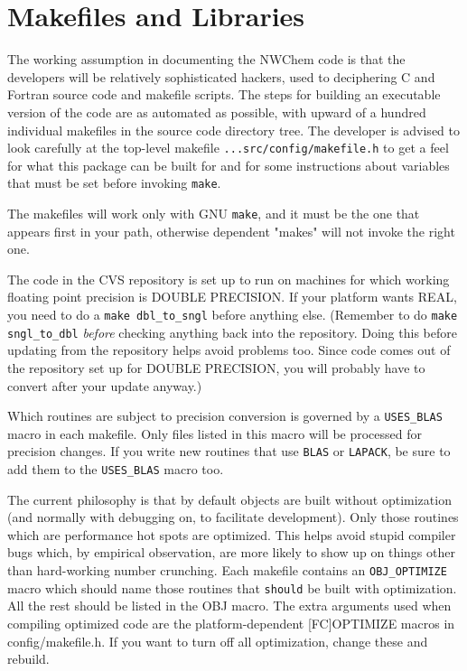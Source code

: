 \section{Makefiles and Libraries}
\label{sec:makelib}


The working assumption in documenting the NWChem code is that the
developers will be relatively sophisticated hackers, used to deciphering
C and Fortran source code and makefile scripts.  The steps for building
an executable version of the code are as automated as possible, with
upward of a hundred individual makefiles in the source code directory
tree.  The developer is advised to look carefully at the top-level
makefile
{\tt ...src/config/makefile.h} to get a feel for what this package can
be built for and for some instructions about variables that must be set
before invoking {\tt make}.

The makefiles will work only with GNU {\tt make}, and it must be the one
that appears first in your path, otherwise dependent "makes" will not
invoke the right one.

The code in the CVS repository is set up to run on machines for
which working floating point precision is DOUBLE PRECISION.  If your
platform wants REAL, you need to do a {\tt make dbl\_to\_sngl} before
anything else.  (Remember to do {\tt make sngl\_to\_dbl} {\em before} checking
anything back into the repository.  Doing this before updating from
the repository helps avoid problems too.  Since code comes out of the
repository set up for DOUBLE PRECISION, you will probably have
to convert after your update anyway.)

Which routines are subject to precision conversion is governed by a
{\tt USES\_BLAS} macro in each makefile.  Only files listed in this macro
will be processed for precision changes.  If you write new routines
that use {\tt BLAS} or {\tt LAPACK}, be sure to add them to the {\tt USES\_BLAS} macro
too.

The current philosophy is that by default objects are built without
optimization (and normally with debugging on, to facilitate
development).  Only those routines which are performance hot spots are
optimized.  This helps avoid stupid compiler bugs which, by empirical
observation, are more likely to show up on things other than
hard-working number crunching.  Each makefile contains an {\tt OBJ\_OPTIMIZE}
macro which should name those routines that {\tt should} be built with
optimization.  All the rest should be listed in the OBJ macro.  The
extra arguments used when compiling optimized code are the
platform-dependent [FC]OPTIMIZE macros in config/makefile.h.  If you
want to turn off all optimization, change these and rebuild.

